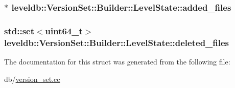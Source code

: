 \subsubsection[{added\+\_\+files}]{$\ast$ leveldb\+::\+Version\+Set\+::\+Builder\+::\+Level\+State\+::added\+\_\+files}\label{structleveldb_1_1_version_set_1_1_builder_1_1_level_state_aeb9a2d830ae2cc5f65c5395e3ece341d}
\hypertarget{structleveldb_1_1_version_set_1_1_builder_1_1_level_state_ac92628909cea4ee134314b5884256619}{}
\subsubsection[{deleted\+\_\+files}]{\setlength{\rightskip}{0pt plus 5cm}std\+::set$<${\bf uint64\+\_\+t}$>$ leveldb\+::\+Version\+Set\+::\+Builder\+::\+Level\+State\+::deleted\+\_\+files}\label{structleveldb_1_1_version_set_1_1_builder_1_1_level_state_ac92628909cea4ee134314b5884256619}


The documentation for this struct was generated from the following file\+:\begin{DoxyCompactItemize}
\item 
db/\hyperlink{version__set_8cc}{version\+\_\+set.\+cc}\end{DoxyCompactItemize}
